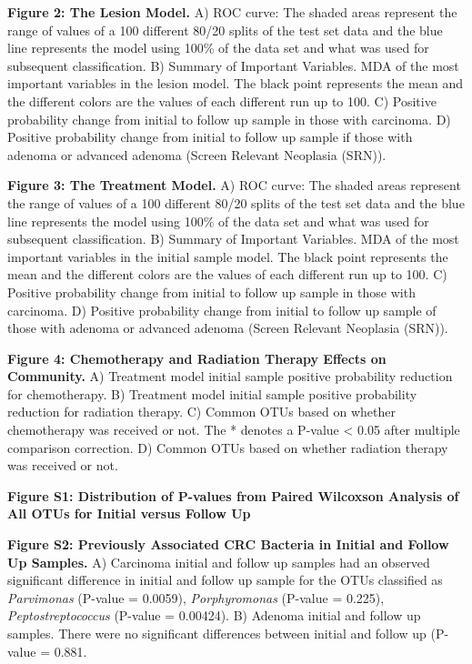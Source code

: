 \documentclass[12pt,]{article}
\begin{document}
\textbf{Figure 2: The Lesion Model.} A) ROC curve: The shaded areas
represent the range of values of a 100 different 80/20 splits of the
test set data and the blue line represents the model using 100\% of the
data set and what was used for subsequent classification. B) Summary of
Important Variables. MDA of the most important variables in the lesion
model. The black point represents the mean and the different colors are
the values of each different run up to 100. C) Positive probability
change from initial to follow up sample in those with carcinoma. D)
Positive probability change from initial to follow up sample if those
with adenoma or advanced adenoma (Screen Relevant Neoplasia (SRN)).

\textbf{Figure 3: The Treatment Model.} A) ROC curve: The shaded areas
represent the range of values of a 100 different 80/20 splits of the
test set data and the blue line represents the model using 100\% of the
data set and what was used for subsequent classification. B) Summary of
Important Variables. MDA of the most important variables in the initial
sample model. The black point represents the mean and the different
colors are the values of each different run up to 100. C) Positive
probability change from initial to follow up sample in those with
carcinoma. D) Positive probability change from initial to follow up
sample of those with adenoma or advanced adenoma (Screen Relevant
Neoplasia (SRN)).

\textbf{Figure 4: Chemotherapy and Radiation Therapy Effects on
Community.} A) Treatment model initial sample positive probability
reduction for chemotherapy. B) Treatment model initial sample positive
probability reduction for radiation therapy. C) Common OTUs based on
whether chemotherapy was received or not. The * denotes a P-value
\textless{} 0.05 after multiple comparison correction. D) Common OTUs
based on whether radiation therapy was received or not.

\newpage

\textbf{Figure S1: Distribution of P-values from Paired Wilcoxson
Analysis of All OTUs for Initial versus Follow Up}

\textbf{Figure S2: Previously Associated CRC Bacteria in Initial and
Follow Up Samples.} A) Carcinoma initial and follow up samples had an
observed significant difference in initial and follow up sample for the
OTUs classified as \emph{Parvimonas} (P-value = 0.0059),
\emph{Porphyromonas} (P-value = 0.225), \emph{Peptostreptococcus}
(P-value = 0.00424). B) Adenoma initial and follow up samples. There
were no significant differences between initial and follow up (P-value =
0.881.
\end{document}
